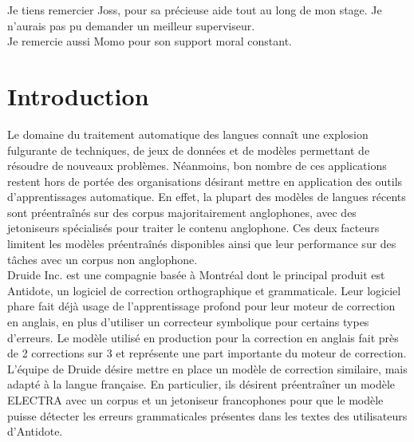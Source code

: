 \documentclass[12pt,twoside,maitrise]{dms}
\theoremstyle{definition}
\numberwithin{equation}{section}
\numberwithin{table}{chapter}
\numberwithin{figure}{chapter}
\begin{document}
Je tiens remercier Joss, pour sa précieuse aide tout au long de mon stage. Je
n'aurais pas pu demander un meilleur superviseur. \\
Je remercie aussi Momo pour son support moral constant.

%
%

\NoChapterPageNumber
\cleardoublepage
{}


\chapter*{Introduction}
Le domaine du traitement automatique des langues connaît une explosion
fulgurante de techniques, de jeux de données et de modèles permettant de
résoudre de nouveaux problèmes. Néanmoins, bon nombre de ces applications
restent hors de portée des organisations désirant mettre en application des
outils d'apprentissages automatique. En effet, la plupart des modèles de
langues récents sont préentraînés sur des corpus majoritairement anglophones,
avec des jetoniseurs spécialisés pour traiter le contenu anglophone. Ces deux
facteurs limitent les modèles préentraînés disponibles ainsi que leur
performance sur des tâches avec un corpus non anglophone.\\

Druide Inc. est une compagnie basée à Montréal dont le principal produit est
Antidote, un logiciel de correction orthographique et grammaticale. Leur
logiciel phare fait déjà usage de l'apprentissage profond pour leur moteur de
correction en anglais, en plus d'utiliser un correcteur symbolique pour
certains types d'erreurs. Le modèle utilisé en production pour la correction en
anglais fait près de 2 corrections sur 3 et représente une part importante du
moteur de correction. L'équipe de Druide désire mettre en place un modèle de
correction similaire, mais adapté à la langue française. En particulier, ils
désirent préentraîner un modèle ELECTRA avec un corpus et un jetoniseur
francophones pour que le modèle puisse détecter les erreurs grammaticales
présentes dans les textes des utilisateurs d'Antidote.\\
\end{document}
